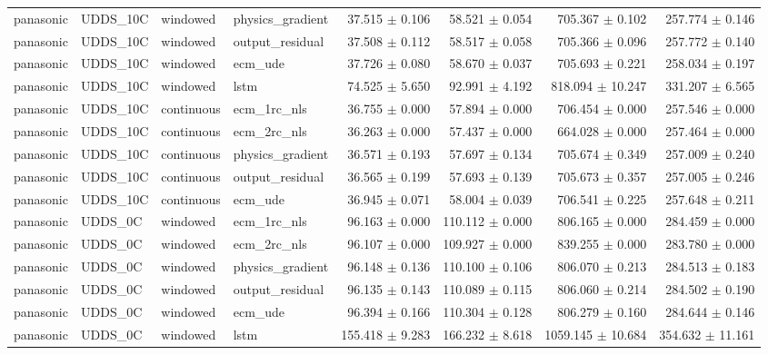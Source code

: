 \begin{longtable}{llllrrrr}
panasonic & UDDS\_10C & windowed & physics\_gradient & 37.515 $\pm$ 0.106 & 58.521 $\pm$ 0.054 & 705.367 $\pm$ 0.102 & 257.774 $\pm$ 0.146 \\
panasonic & UDDS\_10C & windowed & output\_residual & 37.508 $\pm$ 0.112 & 58.517 $\pm$ 0.058 & 705.366 $\pm$ 0.096 & 257.772 $\pm$ 0.140 \\
panasonic & UDDS\_10C & windowed & ecm\_ude & 37.726 $\pm$ 0.080 & 58.670 $\pm$ 0.037 & 705.693 $\pm$ 0.221 & 258.034 $\pm$ 0.197 \\
panasonic & UDDS\_10C & windowed & lstm & 74.525 $\pm$ 5.650 & 92.991 $\pm$ 4.192 & 818.094 $\pm$ 10.247 & 331.207 $\pm$ 6.565 \\
panasonic & UDDS\_10C & continuous & ecm\_1rc\_nls & 36.755 $\pm$ 0.000 & 57.894 $\pm$ 0.000 & 706.454 $\pm$ 0.000 & 257.546 $\pm$ 0.000 \\
panasonic & UDDS\_10C & continuous & ecm\_2rc\_nls & 36.263 $\pm$ 0.000 & 57.437 $\pm$ 0.000 & 664.028 $\pm$ 0.000 & 257.464 $\pm$ 0.000 \\
panasonic & UDDS\_10C & continuous & physics\_gradient & 36.571 $\pm$ 0.193 & 57.697 $\pm$ 0.134 & 705.674 $\pm$ 0.349 & 257.009 $\pm$ 0.240 \\
panasonic & UDDS\_10C & continuous & output\_residual & 36.565 $\pm$ 0.199 & 57.693 $\pm$ 0.139 & 705.673 $\pm$ 0.357 & 257.005 $\pm$ 0.246 \\
panasonic & UDDS\_10C & continuous & ecm\_ude & 36.945 $\pm$ 0.071 & 58.004 $\pm$ 0.039 & 706.541 $\pm$ 0.225 & 257.648 $\pm$ 0.211 \\
panasonic & UDDS\_0C & windowed & ecm\_1rc\_nls & 96.163 $\pm$ 0.000 & 110.112 $\pm$ 0.000 & 806.165 $\pm$ 0.000 & 284.459 $\pm$ 0.000 \\
panasonic & UDDS\_0C & windowed & ecm\_2rc\_nls & 96.107 $\pm$ 0.000 & 109.927 $\pm$ 0.000 & 839.255 $\pm$ 0.000 & 283.780 $\pm$ 0.000 \\
panasonic & UDDS\_0C & windowed & physics\_gradient & 96.148 $\pm$ 0.136 & 110.100 $\pm$ 0.106 & 806.070 $\pm$ 0.213 & 284.513 $\pm$ 0.183 \\
panasonic & UDDS\_0C & windowed & output\_residual & 96.135 $\pm$ 0.143 & 110.089 $\pm$ 0.115 & 806.060 $\pm$ 0.214 & 284.502 $\pm$ 0.190 \\
panasonic & UDDS\_0C & windowed & ecm\_ude & 96.394 $\pm$ 0.166 & 110.304 $\pm$ 0.128 & 806.279 $\pm$ 0.160 & 284.644 $\pm$ 0.146 \\
panasonic & UDDS\_0C & windowed & lstm & 155.418 $\pm$ 9.283 & 166.232 $\pm$ 8.618 & 1059.145 $\pm$ 10.684 & 354.632 $\pm$ 11.161 \\

\end{longtable}
